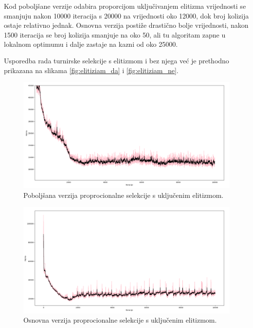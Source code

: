 \documentclass[times, utf8, zavrsni]{fer}
\begin{document}
\newpage

Kod poboljšane verzije odabira proporcijom uključivanjem elitizma vrijednosti se smanjuju nakon 10000 iteracija s 20000 na vrijednosti oko 12000, dok broj kolizija ostaje relativno jednak. Osnovna verzija postiže drastično bolje vrijednosti, nakon 1500 iteracija se broj kolizija smanjuje na oko 50, ali tu algoritam zapne u lokalnom optimumu i dalje zastaje na kazni od oko 25000.

Usporedba rada turnirske selekcije s elitizmom i bez njega već je prethodno prikazana na slikama \ref{fig:elitiziam_da} i \ref{fig:elitiziam_ne}.

\begin{figure}[htb]
\centering
\includegraphics[width=14cm]{images/proporcije_e_da.png}
\caption{Poboljšana verzija proprocionalne selekcije s uključenim elitizmom.}
\label{fig:prop_e_da}
\end{figure}


\begin{figure}[htb]
\centering
\includegraphics[width=14cm]{images/proporcije_e_da_gore.png}
\caption{Osnovna verzija proprocionalne selekcije s uključenim elitizmom.}
\label{fig:proporcije_e_da_gore}
\end{figure}
\end{document}
